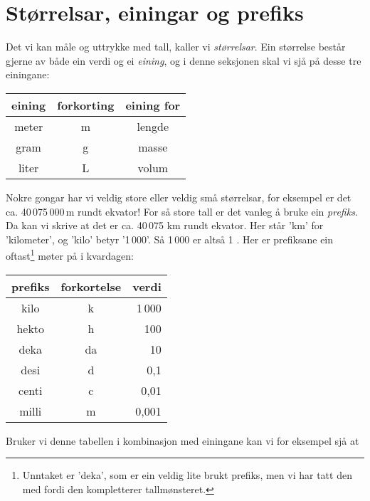 




\section{Størrelsar, einingar og prefiks}
Det vi kan måle og uttrykke med tall, kaller vi \textit{størrelsar}. Ein størrelse består gjerne av både ein verdi og ei \textit{eining}, og i denne seksjonen skal vi sjå på desse tre einingane:
\tbs
\begin{center}
	\begin{tabular}{c|c|c}
		\textbf{eining} & \textbf{forkorting} &\textbf{eining for}\\ \hline
		meter & m &lengde\\\hline
		gram & g &masse\\\hline
		liter & L & volum
	\end{tabular}
\end{center}\tbs
Nokre gongar har vi veldig store eller veldig små størrelsar, for eksempel er det ca. 40\,075\,000\,m rundt ekvator! For så store tall er det vanleg å bruke ein \textit{prefiks}. Da kan vi skrive at det er ca. 40\,075 km rundt ekvator. Her står 'km' for 'kilometer', og 'kilo' betyr '1\,000'. Så 1\,000  er altså 1 . Her er prefiksane ein oftast\footnote{Unntaket er 'deka', som er ein veldig lite brukt prefiks, men vi har tatt den med fordi den kompletterer tallmønsteret.} møter på i kvardagen:
\begin{center}
	\begin{tabular}{c|c|r}
		\textbf{prefiks} & \textbf{forkortelse}&\textbf{verdi} \\ \hline
		kilo & k & 1\,000\phantom{000\;}\\\hline
		hekto & h & 100\phantom{000\;}\\\hline
		deka & da & 10\phantom{000\;}\\\hline
		desi & d & 0,1\phantom{0\,\;}\\\hline
		centi & c & 0,01\phantom{\,\;}\\\hline
		milli & m & 0,001\\\hline		
	\end{tabular}
\end{center}
Bruker vi denne tabellen i kombinasjon med einingane kan vi for eksempel sjå at\vs
{}
